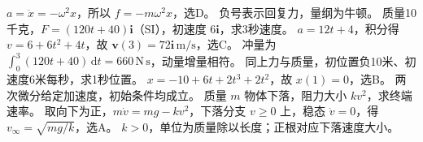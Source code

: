 \workings $a=\ddot x=-\omega^2x$，所以 $f=-m\omega^2x$，选D。
\crosscheck 负号表示回复力，量纲为牛顿。
\problemtext 质量10千克，$F=(120t+40)\bm i$（SI），初速度 $6\bm i$，求3秒速度。
\workings $a=12t+4$，积分得 $v=6+6t^2+4t$，故 $\bm v(3)=72\bm i\,\mathrm{m/s}$，选C。
\crosscheck 冲量为 $\int_0^3(120t+40)\,\mathrm dt=660\,\mathrm{N\,s}$，动量增量相符。
\problemtext 同上力与质量，初位置负10米、初速度6米每秒，求1秒位置。
\workings $x=-10+6t+2t^3+2t^2$，故 $x(1)=0$，选B。
\crosscheck 两次微分给定加速度，初始条件均成立。
\problemtext 质量 $m$ 物体下落，阻力大小 $kv^2$，求终端速率。
\workings 取向下为正，$m\dot v=mg-kv^2$，下落分支 $v\ge0$ 上，稳态 $\dot v=0$，得 $v_\infty=\sqrt{mg/k}$，选A。
\crosscheck $k>0$，单位为质量除以长度；正根对应下落速度大小。

